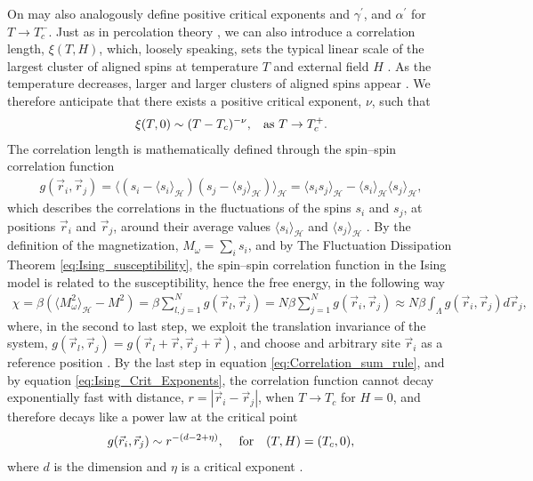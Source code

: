 \documentclass[english,12pt]{ttuthes}
\newcommand{\Hc}{\mathcal{H}}
\begin{document}
On may also analogously define positive critical exponents and $\gamma^\prime$,
and $\alpha^\prime$ for $T\to T_c^-$. Just as in percolation theory 
\cite{Christensen-2005,Stauffer-92}, we can also introduce a
correlation length, $\xi(T,H)$, which, loosely speaking, sets the
typical linear scale of the largest cluster of aligned spins at
temperature $T$ and external field $H$ \cite{Christensen-2005}. As the
temperature decreases, larger and larger clusters of aligned spins
appear \cite{Christensen-2005,Ruelle-1969}. We therefore anticipate
that there exists a positive critical exponent, $\nu$, such that 
%
\begin{align}
  \xi(T,0)\sim(T-T_c)^{-\nu},  \hspace{0.12in} \text{as  }  T\to T_c^+. 
\end{align}
%
The correlation length is mathematically defined through the
spin--spin correlation function
%
\begin{align}
  g(\vec{r}_i,\vec{r}_j)=\langle(s_i-\langle s_i\rangle_{\Hc})(s_j-\langle s_j\rangle_{\Hc})\rangle_{\Hc}
                     =\langle s_is_j\rangle_{\Hc}-\langle s_i\rangle_{\Hc}\langle s_j\rangle_{\Hc},
\end{align}
%
which describes the correlations in the fluctuations of the spins
$s_i$ and $s_j$, at positions $\vec{r}_i$ and $\vec{r}_j$, around
their average values $\langle s_i\rangle_{\Hc}$ and
$\langle s_j\rangle_{\Hc}$ \cite{Christensen-2005}. By the definition of
the magnetization, $M_\omega=\sum_is_i$, and by The Fluctuation Dissipation Theorem
\eqref{eq:Ising_susceptibility}, the spin--spin correlation function
in the Ising model is related to the susceptibility, hence the free
energy, in the following way \cite{Christensen-2005}
%
\begin{align}\label{eq:Correlation_sum_rule}
  \chi=\beta(\langle M_\omega^2\rangle_{\Hc}-M^2)
   =\beta\sum_{l,j=1}^Ng(\vec{r}_l,\vec{r}_j)
   =N\beta\sum_{j=1}^Ng(\vec{r}_i,\vec{r}_j)
   \approx N\beta\int_\Lambda g(\vec{r}_i,\vec{r}_j)d\vec{r}_j,
\end{align}
%
where, in the second to last step, we exploit the translation
invariance of the system, 
$g(\vec{r}_l,\vec{r}_j)=g(\vec{r}_l+\vec{r},\vec{r}_j+\vec{r})$, and
choose and arbitrary site $\vec{r}_i$ as a reference position
\cite{Christensen-2005}. By the last step in equation
\eqref{eq:Correlation_sum_rule}, and by equation
\eqref{eq:Ising_Crit_Exponents}, the correlation function cannot decay
exponentially fast with distance, $r=|\vec{r}_i-\vec{r}_j|$, when
$T\to T_c$ for $H=0$, and therefore decays like a power law at the
critical point  
%
\begin{align}
  g(\vec{r}_i,\vec{r}_j)\sim r^{-(d-2+\eta)},  \hspace{0.12in}
  \text{ for}\quad  (T,H)=(T_c,0),
\end{align}
%
where $d$ is the dimension and $\eta$ is a critical exponent
\cite{Christensen-2005}.
\end{document}
